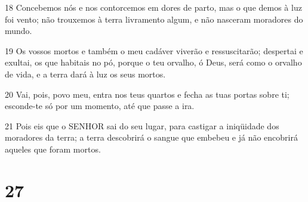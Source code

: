 \par 18 Concebemos nós e nos contorcemos em dores de parto, mas o que demos à luz foi vento; não trouxemos à terra livramento algum, e não nasceram moradores do mundo.
\par 19 Os vossos mortos e também o meu cadáver viverão e ressuscitarão; despertai e exultai, os que habitais no pó, porque o teu orvalho, ó Deus, será como o orvalho de vida, e a terra dará à luz os seus mortos.
\par 20 Vai, pois, povo meu, entra nos teus quartos e fecha as tuas portas sobre ti; esconde-te só por um momento, até que passe a ira.
\par 21 Pois eis que o SENHOR sai do seu lugar, para castigar a iniqüidade dos moradores da terra; a terra descobrirá o sangue que embebeu e já não encobrirá aqueles que foram mortos.

\chapter{27}

